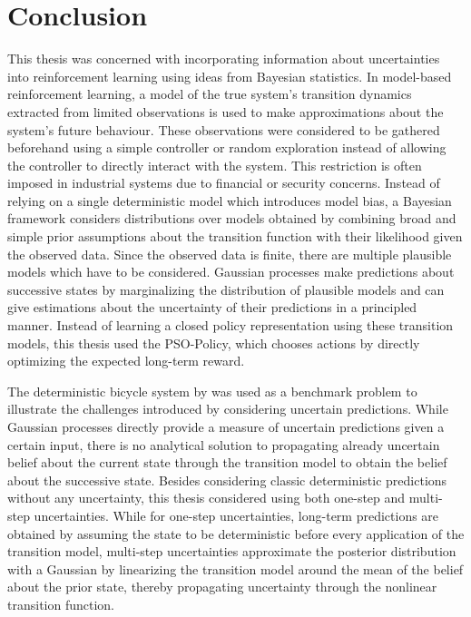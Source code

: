 \chapter{Conclusion}
This thesis was concerned with incorporating information about uncertainties into reinforcement learning using ideas from Bayesian statistics.
In model-based reinforcement learning, a model of the true system's transition dynamics extracted from limited observations is used to make approximations about the system's future behaviour.
These observations were considered to be gathered beforehand using a simple controller or random exploration instead of allowing the controller to directly interact with the system.
This restriction is often imposed in industrial systems due to financial or security concerns.
Instead of relying on a single deterministic model which introduces model bias, a Bayesian framework considers distributions over models obtained by combining broad and simple prior assumptions about the transition function with their likelihood given the observed data.
Since the observed data is finite, there are multiple plausible models which have to be considered.
Gaussian processes make predictions about successive states by marginalizing the distribution of plausible models and can give estimations about the uncertainty of their predictions in a principled manner.
Instead of learning a closed policy representation using these transition models, this thesis used the PSO-Policy, which chooses actions by directly optimizing the expected long-term reward.

The deterministic bicycle system by \citeauthor{randlov_learning_1998} was used as a benchmark problem to illustrate the challenges introduced by considering uncertain predictions.
While Gaussian processes directly provide a measure of uncertain predictions given a certain input, there is no analytical solution to propagating already uncertain belief about the current state through the transition model to obtain the belief about the successive state.
Besides considering classic deterministic predictions without any uncertainty, this thesis considered using both one-step and multi-step uncertainties.
While for one-step uncertainties, long-term predictions are obtained by assuming the state to be deterministic before every application of the transition model, multi-step uncertainties approximate the posterior distribution with a Gaussian by linearizing the transition model around the mean of the belief about the prior state, thereby propagating uncertainty through the nonlinear transition function.

